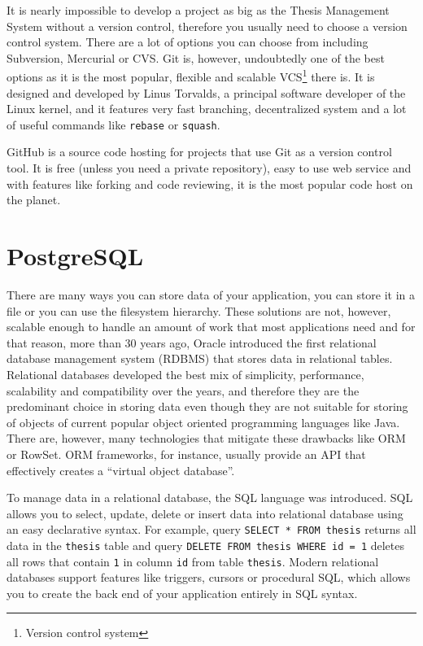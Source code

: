 It is nearly impossible to develop a project as big as the Thesis Management System without a version control, therefore you usually need to choose a version control system. There are a lot of options you can choose from including Subversion, Mercurial or CVS. Git is, however, undoubtedly one of the best options as it is the most popular, flexible and scalable VCS\footnote{Version control system} there is. It is designed and developed by Linus Torvalds, a principal software developer of the Linux kernel, and it features very fast branching, decentralized system and a lot of useful commands like \texttt{rebase} or \texttt{squash}.

GitHub is a source code hosting for projects that use Git as a version control tool. It is free (unless you need a private repository), easy to use web service and with features like forking and code reviewing, it is the most popular code host on the planet\cite{github-features}.

\section{PostgreSQL}

There are many ways you can store data of your application, you can store it in a file or you can use the filesystem hierarchy. These solutions are not, however, scalable enough to handle an amount of work that most applications need and for that reason, more than 30 years ago, Oracle introduced the first relational database management system (RDBMS) that stores data in relational tables. Relational databases developed the best mix of simplicity, performance, scalability and compatibility over the years, and therefore they are the predominant choice in storing data even though they are not suitable for storing of objects of current popular object oriented programming languages like Java. There are, however, many technologies that mitigate these drawbacks like ORM or RowSet. ORM frameworks, for instance, usually provide an API that effectively creates a ``virtual object database''.

To manage data in a relational database, the SQL language was introduced. SQL allows you to select, update, delete or insert data into relational database using an easy declarative syntax. For example, query \texttt{SELECT * FROM thesis} returns all data in the \texttt{thesis} table and query \texttt{DELETE FROM thesis WHERE id = 1} deletes all rows that contain \texttt{1} in column \texttt{id} from table \texttt{thesis}. Modern relational databases support features like triggers, cursors or procedural SQL, which allows you to create the back end of your application entirely in SQL syntax.

